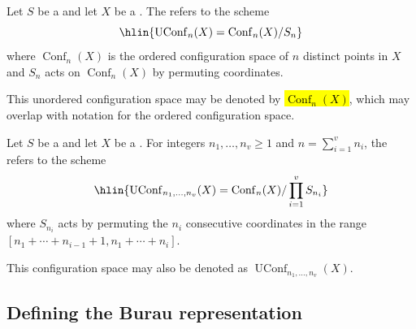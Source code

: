 \begin{definition} \label{definition:unordered_configuration_space_of_n_distinct_points_in_a_scheme_over_a_scheme}
    Let $S$ be a  and let $X$ be a . 
    The  refers to the scheme 
    $$\hlin{\operatorname{UConf}_n(X) = \operatorname{Conf}_n(X) / S_n}$$
     where $\operatorname{Conf}_n(X)$ is the ordered configuration space of $n$ distinct points in $X$ and $S_n$ acts on $\operatorname{Conf}_n(X)$ by permuting coordinates.

    This unordered configuration space may be denoted by \hl{$\operatorname{Conf}_n(X)$}, which may overlap with notation for the ordered configuration space.

\end{definition}

\begin{definition} \label{definition:unordered_configuration_space_of_colored_distinct_points_in_a_scheme_over_a_scheme}
    Let $S$ be a  and let $X$ be a . 
    For integers $n_1,\ldots,n_v \geq 1$ and $n = \sum_{i=1}^v n_i$, the  refers to the scheme 
    $$\hlin{\operatorname{UConf}_{n_1,\ldots,n_v}(X) = \operatorname{Conf}_n(X) / \prod_{i=1}^v S_{n_i}}$$
     where $S_{n_i}$ acts by permuting the $n_i$ consecutive coordinates in the range $[n_1+\cdots + n_{i-1} + 1, n_1 + \cdots + n_i]$. 

    This configuration space may also be denoted as $\operatorname{UConf}_{n_1,\ldots,n_v}(X)$.
\end{definition}





\subsection{Defining the Burau representation}

